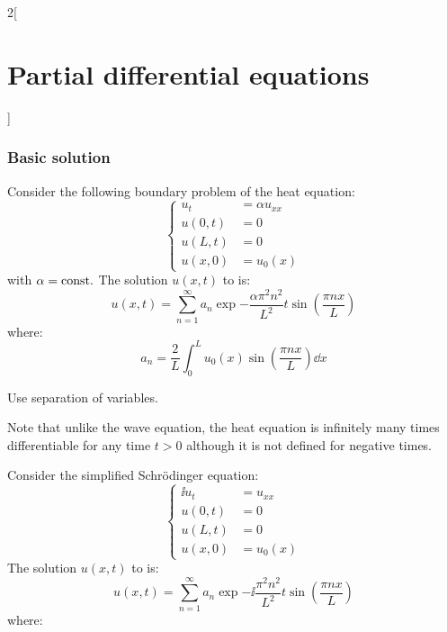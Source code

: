 \documentclass[../../../main_math.tex]{subfiles}
\begin{document}
\begin{multicols}{2}[\section{Partial differential equations}]
  \subsubsection{Basic solution}
  \begin{proposition}
    Consider the following boundary problem of the heat equation:
    \begin{equation}\label{PDE:heat-fixedendpoints}
      \left\{
      \begin{aligned}
        u_{t}  & =\alpha u_{xx} \\
        u(0,t) & =0             \\
        u(L,t) & =0             \\
        u(x,0) & =u_0(x)
      \end{aligned}
      \right.
    \end{equation}
    with $\alpha=\text{const.}$
    The solution $u(x,t)$ to  is: $$u(x,t)=\sum_{n=1}^\infty a_n\exp{-\frac{\alpha\pi^2n^2}{L^2}t}\sin\left(\frac{\pi n x}{L}\right)$$ where:
    \begin{equation*}
      a_n =\frac{2}{L}\int_{0}^Lu_0(x)\sin\left(\frac{\pi n x}{L}\right)\dd{x}
    \end{equation*}
  \end{proposition}
  \begin{sproof}
    Use separation of variables.
  \end{sproof}
  \begin{remark}
    Note that unlike the wave equation, the heat equation is infinitely many times differentiable for any time $t>0$ although it is not defined for negative times.
  \end{remark}
  \begin{proposition}
    Consider the simplified Schrödinger equation:
    \begin{equation}\label{PDE:schro-fixedendpoints}
      \left\{
      \begin{aligned}
        \ii u_{t} & =u_{xx} \\
        u(0,t)    & =0      \\
        u(L,t)    & =0      \\
        u(x,0)    & =u_0(x)
      \end{aligned}
      \right.
    \end{equation}
    The solution $u(x,t)$ to  is: $$u(x,t)=\sum_{n=1}^\infty a_n\exp{-\ii\frac{\pi^2n^2}{L^2}t}\sin\left(\frac{\pi n x}{L}\right)$$ where:
    \begin{equation*}

\end{equation*}
\end{proposition}
\end{multicols}
\end{document}
